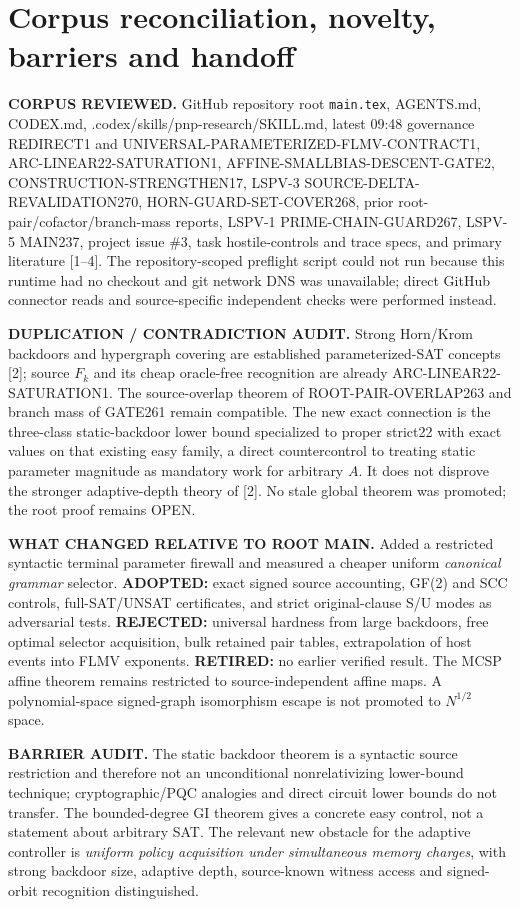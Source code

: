 \documentclass[11pt]{article}
\begin{document}
\section{Corpus reconciliation, novelty, barriers and handoff}
\noindent\textbf{CORPUS REVIEWED.} GitHub repository root \texttt{main.tex}, AGENTS.md, CODEX.md, .codex/skills/pnp-research/SKILL.md, latest 09:48 governance REDIRECT1 and UNIVERSAL-PARAMETERIZED-FLMV-CONTRACT1, ARC-LINEAR22-SATURATION1, AFFINE-SMALLBIAS-DESCENT-GATE2, CONSTRUCTION-STRENGTHEN17, LSPV-3 SOURCE-DELTA-REVALIDATION270, HORN-GUARD-SET-COVER268, prior root-pair/cofactor/branch-mass reports, LSPV-1 PRIME-CHAIN-GUARD267, LSPV-5 MAIN237, project issue \#3, task hostile-controls and trace specs, and primary literature [1--4]. The repository-scoped preflight script could not run because this runtime had no checkout and git network DNS was unavailable; direct GitHub connector reads and source-specific independent checks were performed instead.

\noindent\textbf{DUPLICATION / CONTRADICTION AUDIT.} Strong Horn/Krom backdoors and hypergraph covering are established parameterized-SAT concepts [2]; source $F_k$ and its cheap oracle-free recognition are already ARC-LINEAR22-SATURATION1. The source-overlap theorem of ROOT-PAIR-OVERLAP263 and branch mass of GATE261 remain compatible. The new exact connection is the three-class static-backdoor lower bound specialized to proper strict22 with exact values on that existing easy family, a direct countercontrol to treating static parameter magnitude as mandatory work for arbitrary $A$. It does not disprove the stronger adaptive-depth theory of [2]. No stale global theorem was promoted; the root proof remains OPEN.

\noindent\textbf{WHAT CHANGED RELATIVE TO ROOT MAIN.} Added a restricted syntactic terminal parameter firewall and measured a cheaper uniform \emph{canonical grammar} selector. \textbf{ADOPTED:} exact signed source accounting, GF(2) and SCC controls, full-SAT/UNSAT certificates, and strict original-clause S/U modes as adversarial tests. \textbf{REJECTED:} universal hardness from large backdoors, free optimal selector acquisition, bulk retained pair tables, extrapolation of host events into FLMV exponents. \textbf{RETIRED:} no earlier verified result. The MCSP affine theorem remains restricted to source-independent affine maps. A polynomial-space signed-graph isomorphism escape is not promoted to $N^{1/2}$ space.

\noindent\textbf{BARRIER AUDIT.} The static backdoor theorem is a syntactic source restriction and therefore not an unconditional nonrelativizing lower-bound technique; cryptographic/PQC analogies and direct circuit lower bounds do not transfer. The bounded-degree GI theorem gives a concrete easy control, not a statement about arbitrary SAT. The relevant new obstacle for the adaptive controller is \emph{uniform policy acquisition under simultaneous memory charges}, with strong backdoor size, adaptive depth, source-known witness access and signed-orbit recognition distinguished.
\end{document}
